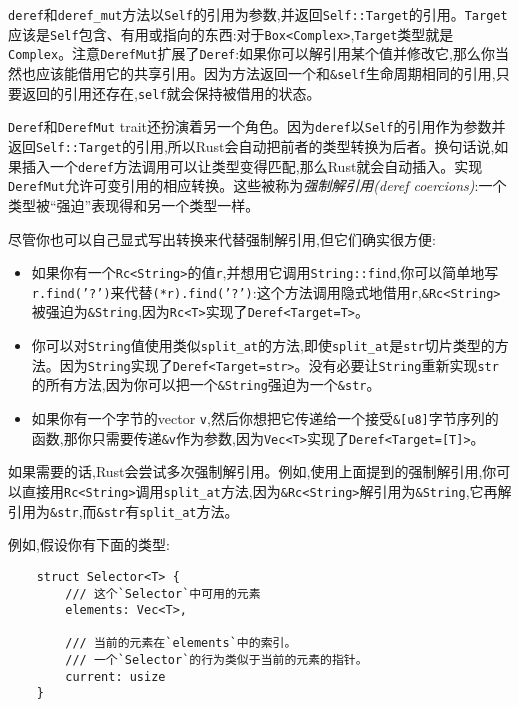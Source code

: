 \texttt{deref}和\texttt{deref\_mut}方法以\texttt{Self}的引用为参数,并返回\texttt{Self::Target}的引用。\texttt{Target}应该是\texttt{Self}包含、有用或指向的东西:对于\texttt{Box<Complex>},\texttt{Target}类型就是\texttt{Complex}。注意\texttt{DerefMut}扩展了\texttt{Deref}:如果你可以解引用某个值并修改它,那么你当然也应该能借用它的共享引用。因为方法返回一个和\texttt{\&self}生命周期相同的引用,只要返回的引用还存在,\texttt{self}就会保持被借用的状态。

\texttt{Deref}和\texttt{DerefMut} trait还扮演着另一个角色。因为\texttt{deref}以\texttt{Self}的引用作为参数并返回\texttt{Self::Target}的引用,所以Rust会自动把前者的类型转换为后者。换句话说,如果插入一个\texttt{deref}方法调用可以让类型变得匹配,那么Rust就会自动插入。实现\texttt{DerefMut}允许可变引用的相应转换。这些被称为\emph{强制解引用(deref coercions)}:一个类型被“强迫”表现得和另一个类型一样。

尽管你也可以自己显式写出转换来代替强制解引用,但它们确实很方便:
\begin{itemize}
    \item 如果你有一个\texttt{Rc<String>}的值\texttt{r},并想用它调用\texttt{String::find},你可以简单地写\\
    \texttt{r.find('?')}来代替\texttt{(*r).find('?')}:这个方法调用隐式地借用\texttt{r},\texttt{\&Rc<String>}被强迫为\texttt{\&String},因为\texttt{Rc<T>}实现了\texttt{Deref<Target=T>}。
    \item 你可以对\texttt{String}值使用类似\texttt{split\_at}的方法,即使\texttt{split\_at}是\texttt{str}切片类型的方法。因为\texttt{String}实现了\texttt{Deref<Target=str>}。没有必要让\texttt{String}重新实现\texttt{str}的所有方法,因为你可以把一个\texttt{\&String}强迫为一个\texttt{\&str}。
    \item 如果你有一个字节的vector \texttt{v},然后你想把它传递给一个接受\texttt{\&[u8]}字节序列的函数,那你只需要传递\texttt{\&v}作为参数,因为\texttt{Vec<T>}实现了\texttt{Deref<Target=[T]>}。
\end{itemize}

如果需要的话,Rust会尝试多次强制解引用。例如,使用上面提到的强制解引用,你可以直接用\texttt{Rc<String>}调用\texttt{split\_at}方法,因为\texttt{\&Rc<String>}解引用为\texttt{\&String},它再解引用为\texttt{\&str},而\texttt{\&str}有\texttt{split\_at}方法。

例如,假设你有下面的类型:
\begin{verbatim}
    struct Selector<T> {
        /// 这个`Selector`中可用的元素
        elements: Vec<T>,

        /// 当前的元素在`elements`中的索引。
        /// 一个`Selector`的行为类似于当前的元素的指针。
        current: usize
    }
\end{verbatim}

